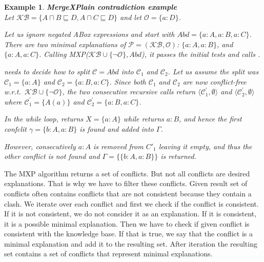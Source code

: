 \documentclass[12pt,a4paper]{article}
\newtheorem{example}{Example}[subsection]
\begin{document}
\begin{example}{\textbf{MergeXPlain contradiction example}}
	\label{example:mxpContradiction}
	\\
	Let $\mathcal{KB} = \{ A \sqcap B \sqsubseteq D, A \sqcap C \sqsubseteq D\}$ and let $\mathcal{O} = \{ a:D \}$. 
	
	Let us ignore negated ABox expressions and start with $Abd = \{ a:A, a:B,
	a:C \}$. There are two minimal explanations of $\mathcal{P} = (\mathcal{KB}, \mathcal{O})$: $\{ a:A, a:B \}$, and	$\{ a:A, a:C \}$. Calling MXP($\mathcal{KB} \cup \{\neg \mathcal{O}\}, Abd$), it passes the
	initial tests and calls .
	
	 needs to decide how to split $\mathcal{C} = Abd$ into $\mathcal{C}_{1}$
	and $\mathcal{C}_{2}$. Let us assume the split was $\mathcal{C}_{1} = \{ a:A \}$ and $\mathcal{C}_{2} =
	\{ a:B, a:C \}$. Since both $\mathcal{C}_{1}$ and $\mathcal{C}_{2}$ are now conflict-free w.r.t.\
	$\mathcal{KB} \cup \{\neg \mathcal{O}\}$, the two consecutive recursive calls return
	$\langle \mathcal{C}^{\prime}_{1},\emptyset \rangle$ and $\langle \mathcal{C}^{\prime}_{2},\emptyset \rangle$ where
	$\mathcal{C}^{\prime}_{1}=\{A(a)\}$ and $\mathcal{C}^{\prime}_{2}=\{ a:B, a:C \}$.
	
	In the while loop, \Call{getConflict}{$\mathcal{KB} \cup \{\neg \mathcal{O}\}\cup
		\{a:B,a:C\},$ $\{a:B,a:C\},$ $\{a:A\}$} returns $X = \{a:A\}$ while
	 returns $a:B$, and hence the first
	confclit $\gamma = \{b:A,a:B\}$ is found and added into $\Gamma$.
	
	However, consecutively $a:A$ is removed from $C'_1$ leaving it empty,
	and thus the other conflict is not found and $\Gamma = \{\{b:A,a:B\}\}$ is
	returned.	
\end{example}

The MXP algorithm returns a set of conflicts. But not all conflicts are desired explanations. That is why we have to filter these conflicts. Given result set of conflicts often contains conflicts that are not consistent because they contain a clash. We iterate over each conflict and first we check if the conflict is consistent. If it is not consistent, we do not consider it as an explanation. If it is consistent, it is a possible minimal explanation. Then we have to check if given conflict is consistent with the knowledge base. If that is true, we say that the conflict is a minimal explanation and add it to the resulting set. After iteration the resulting set contains a set of conflicts that represent minimal explanations.
\end{document}
